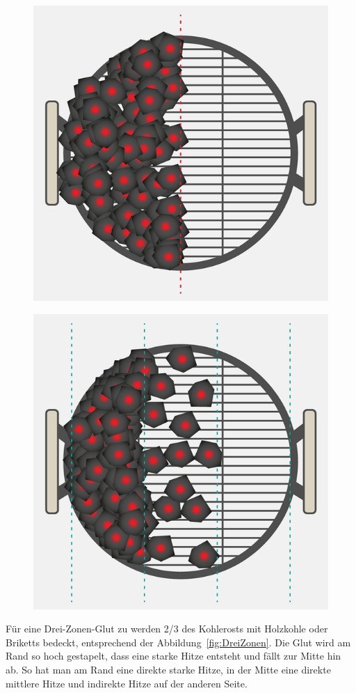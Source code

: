 \begin{figure}[htbp]
	\centering
	\begin{minipage}{.5\textwidth}
		\centering
		\includegraphics[width=.5\linewidth]{pics/ZweiZonen}
		\label{fig:ZweiZonen}
	\end{minipage}%
	\begin{minipage}{.5\textwidth}
		\centering
		\includegraphics[width=.5\linewidth]{pics/DreiZonen}
		\label{fig:DreiZonen}
	\end{minipage}%
\end{figure}

	Für eine Drei-Zonen-Glut zu werden 2/3 des Kohlerosts mit Holzkohle oder 
	Briketts bedeckt, entsprechend der 
	Abbildung~\vref{fig:DreiZonen}. Die Glut wird am Rand so hoch gestapelt, dass 
	eine starke Hitze entsteht und fällt zur Mitte 
	hin 
	ab. So hat man am Rand eine direkte starke Hitze, in der Mitte eine direkte 
	mittlere Hitze und indirekte Hitze auf der anderen 
	Seite.

